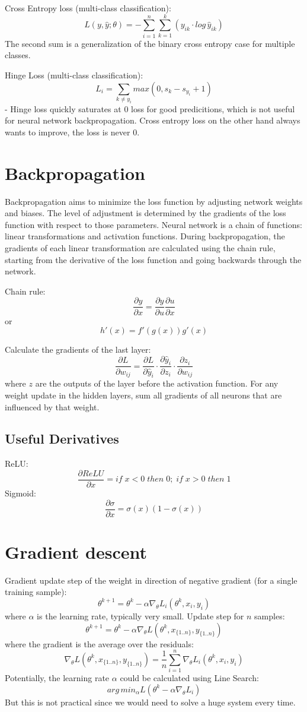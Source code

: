 \documentclass{scrartcl}
\begin{document}
Cross Entropy loss (multi-class classification):
$$L(y, \hat{y}; \theta) = - \sum_{i=1}^{n} \sum_{k=1}^{k} (y_{ik} \cdot log \, \hat{y}_{ik})$$
The second sum is a generalization of the binary cross entropy case for multiple classes.

Hinge Loss (multi-class classification):
$$L_i = \sum_{k \neq y_i} max(0, s_k - s_{y_i} + 1)$$
- Hinge loss quickly saturates at 0 loss for good predicitions, which is not useful for neural network backpropagation. Cross entropy loss on the other hand always wants to improve, the loss is never 0.


\section*{Backpropagation}
Backpropagation aims to minimize the loss function by adjusting network weights and biases. The level of adjustment is determined by the gradients of the loss function with respect to those parameters.
Neural network is a chain of functions: linear transformations and activation functions. During backpropagation, the gradients of each linear transformation are calculated using the chain rule, starting from the derivative of the loss function and going backwards through the network.

Chain rule:
$$\frac{\partial y}{\partial x}=\frac{\partial y}{\partial u} \frac{\partial u}{\partial x}$$
or
$$h'(x) = f'(g(x))g'(x)$$

Calculate the gradients of the last layer:
$$\frac{\partial L}{\partial w_{ij}} = \frac{\partial L}{\partial \hat{y}_i} \cdot \frac{\partial \hat{y}_i}{\partial z_i} \cdot \frac{\partial z_i}{\partial w_{ij}}$$
where $z$ are the outputs of the layer before the activation function.
For any weight update in the hidden layers, sum all gradients of all neurons that are influenced by that weight.

\subsection*{Useful Derivatives}
ReLU:
$$\frac{\partial ReLU}{\partial x} = if \; x < 0 \; then \; 0; \; if \; x > 0 \; then \; 1$$
Sigmoid:
$$\frac{\partial \sigma}{\partial x} = \sigma (x) (1 - \sigma (x))$$


\section*{Gradient descent}
Gradient update step of the weight in direction of negative gradient (for a single training sample):
$$\theta^{k+1} = \theta^k - \alpha \nabla_\theta L_i(\theta^k, x_i,y_i)$$
where $\alpha$ is the learning rate, typically very small.
Update step for $n$ samples:
$$\theta^{k+1} = \theta^k - \alpha \nabla_\theta L(\theta^k, x_{\{1..n\}}, y_{\{1..n\}})$$
where the gradient is the average over the residuals:
$$\nabla_\theta L(\theta^k, x_{\{1..n\}}, y_{\{1..n\}}) = \frac{1}{n} \sum_{i=1}^{n} \nabla_\theta L_i(\theta^k, x_i, y_i)$$
Potentially, the learning rate $\alpha$ could be calculated using Line Search:
$$arg \, min_\alpha L(\theta^k - \alpha \nabla_\theta L_i)$$
But this is not practical since we would need to solve a huge system every time.
\end{document}
